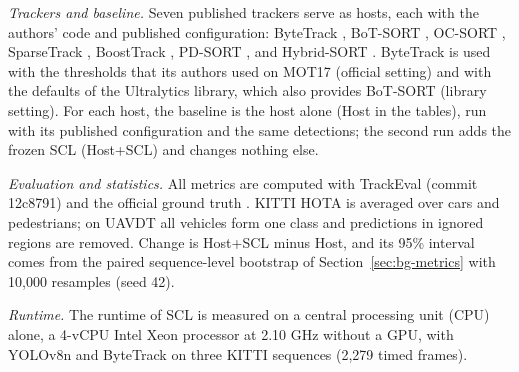 \emph{Trackers and baseline.} Seven published trackers serve as hosts, each with the authors' code and published configuration: ByteTrack \cite{zhang2022bytetrack}, BoT-SORT \cite{aharon2022botsort}, OC-SORT \cite{cao2023ocsort}, SparseTrack \cite{liu2025sparsetrack}, BoostTrack \cite{stanojevic2024boosttrack}, PD-SORT \cite{wang2025pdsort}, and Hybrid-SORT \cite{yang2024hybridsort}. ByteTrack is used with the thresholds that its authors used on MOT17 (official setting) and with the defaults of the Ultralytics library, which also provides BoT-SORT (library setting). For each host, the baseline is the host alone (Host in the tables), run with its published configuration and the same detections; the second run adds the frozen SCL (Host+SCL) and changes nothing else.

\emph{Evaluation and statistics.} All metrics are computed with TrackEval (commit 12c8791) and the official ground truth \cite{dendorfer2021motchallenge}. KITTI HOTA is averaged over cars and pedestrians; on UAVDT all vehicles form one class and predictions in ignored regions are removed. Change is Host+SCL minus Host, and its 95\% interval comes from the paired sequence-level bootstrap of Section~\ref{sec:bg-metrics} with 10,000 resamples (seed 42).

\emph{Runtime.} The runtime of SCL is measured on a central processing unit (CPU) alone, a 4-vCPU Intel Xeon processor at 2.10 GHz without a GPU, with YOLOv8n and ByteTrack on three KITTI sequences (2,279 timed frames).

